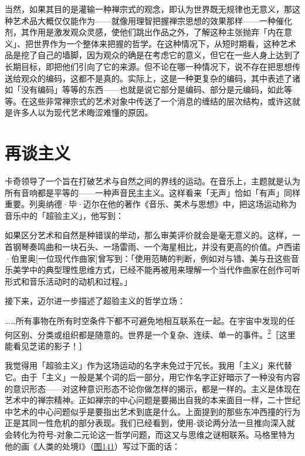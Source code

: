 \documentclass[
  12pt,
  twoside,
  openright,
  oldfontcommands,
]{memoir}
\newenvironment{fsquote}{%
  \begin{mdframed}[style=gebquote]\kaitifamily\small%
}{%
  \end{mdframed}%
}
\begin{document}
当然，如果其目的是灌输一种禅宗式的观念，即认为世界既无规律也无意义，那这种艺术品大概仅仅能作为------就像用理智把握禅宗思想的效果那样------一种催化剂，其作用是激发观众灵感，使他们跳出作品之外，了解这种主张抛弃「内在意义」、把世界作为一个整体来把握的哲学。在这种情况下，从短时期看，这种艺术品是挖了自己的墙脚，因为观众的确是在考虑它的意义，但它在一些人身上达到了长期目标，即把他们引向了它的来源。但不论在哪一种情况下，说不存在把思想传送给观众的编码，这都不是真的。实际上，这是一种更复杂的编码，其中表述了诸如「没有编码」等等的东西------也就是说它部分是编码、部分是元编码，如此等等。在这些非常禅宗式的艺术对象中传送了一个消息的缠结的层次结构，或许这就是许多人以为现代艺术晦涩难懂的原因。

\section{再谈主义}

卡奇领导了一个旨在打破艺术与自然之间的界线的运动。在音乐上，主题就是认为所有音响都是平等的------一种声音民主主义。这样看来「无声」恰如「有声」同样重要。列奥纳德·毕·迈尔在他的著作《音乐、美术与思想》中，把这场运动称为音乐中的「超验主义」，他写到：

\begin{fsquote}
如果区分艺术和自然是种错误的举动，那么审美评价就会是毫无意义的。这样，一首钢琴奏鸣曲和一块石头、一场雷雨、一个海星相比，并没有更高的价值。卢西诺·伯里奥{[}一位现代作曲家{]}曾写到：「使用范畴的判断，例如对与错、美与丑这些音乐美学中的典型理性思维方式，已经不能再被用来理解一个当代作曲家在创作可听形式和音乐活动时的动机和过程。」
\end{fsquote}

接下来，迈尔进一步描述了超验主义的哲学立场：

\ldots\ldots 所有事物在所有时空条件下都不可避免地相互联系在一起。在宇宙中发现的任何区别、分类或组织都是随意的。世界是一个复杂、连续、单一的事件。\hyperref[fn:Chapter20-2]{\textsuperscript{2}}［这里能看见芝诺的影子！］

我觉得用「超验主义」作为这场运动的名字未免过于冗长。我用「主义」来代替它。由于「主义」一般是某个词的后一部分，用它作名字正好暗示了一种没有内容的意识形态------对这种意识形态不论你做怎样的揭示，都是一样的。主义是体现在艺术中的禅宗精神。正如禅宗的中心问题是要揭出自我的本来面目一样，二十世纪中艺术的中心问题似乎是要指出艺术到底是什么。上面提到的那些东冲西撞的行为正是其同一性危机的部分表现。我们已经看到，使用-谈论两分法一旦推向深入就会转化为符号-对象二元论这一哲学问题，而这又与思维之谜相联系。马格里特为他的画《人类的处境I》（\hyperref[fig:141]{图141}）写过下面的话：
\end{document}
